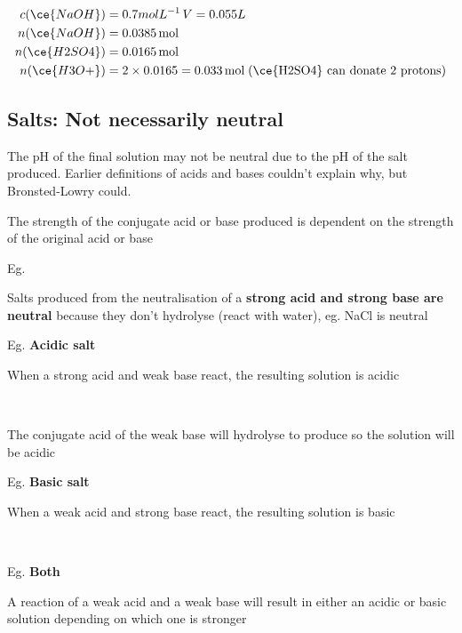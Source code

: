 	\begin{align*}
		c(\ce{NaOH}) &= 0.7molL^{-1} \, V = 0.055L \\
		n(\ce{NaOH}) &= 0.0385 \, \text{mol} \\
		n(\ce{H2SO4}) &= 0.0165 \, \text{mol} \\
		n(\ce{H3O+}) &= 2 \times 0.0165 = 0.033 \, \text{mol} \; \text{(\ce{H2SO4} can donate 2 protons)}
	\end{align*}

	\subsection{Salts: Not necessarily neutral}
	
		The pH of the final solution may not be neutral due to the pH of the salt produced. Earlier definitions of acids and bases couldn't explain why, but Bronsted-Lowry could.

		The strength of the conjugate acid or base produced is dependent on the strength of the original acid or base
		
		Eg. 

		Salts produced from the neutralisation of a \textbf{strong acid and strong base are neutral} because they don't hydrolyse (react with water), eg. NaCl is neutral 

		Eg. \textbf{Acidic salt}

		When a strong acid and weak base react, the resulting solution is acidic

		\begin{center}
			 \\
		\end{center}

		The conjugate acid of the weak base will hydrolyse to produce  so the solution will be acidic

		Eg. \textbf{Basic salt}

		When a weak acid and strong base react, the resulting solution is basic

		\begin{center}
			 \\
		\end{center}

		Eg. \textbf{Both}

		A reaction of a weak acid and a weak base will result in either an acidic or basic solution depending on which one is stronger

